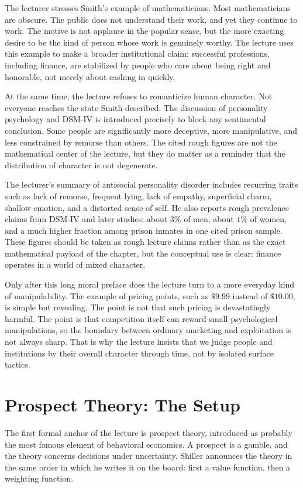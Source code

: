 The lecturer stresses Smith's example of mathematicians. Most mathematicians are obscure. The public does not understand their work, and yet they continue to work. The motive is not applause in the popular sense, but the more exacting desire to be the kind of person whose work is genuinely worthy. The lecture uses this example to make a broader institutional claim: successful professions, including finance, are stabilized by people who care about being right and honorable, not merely about cashing in quickly.

At the same time, the lecture refuses to romanticize human character. Not everyone reaches the state Smith described. The discussion of personality psychology and DSM-IV is introduced precisely to block any sentimental conclusion. Some people are significantly more deceptive, more manipulative, and less constrained by remorse than others. The cited rough figures are not the mathematical center of the lecture, but they do matter as a reminder that the distribution of character is not degenerate.

The lecturer's summary of antisocial personality disorder includes recurring traits such as lack of remorse, frequent lying, lack of empathy, superficial charm, shallow emotion, and a distorted sense of self. He also reports rough prevalence claims from DSM-IV and later studies: about \(3\%\) of men, about \(1\%\) of women, and a much higher fraction among prison inmates in one cited prison sample. These figures should be taken as rough lecture claims rather than as the exact mathematical payload of the chapter, but the conceptual use is clear: finance operates in a world of mixed character.

Only after this long moral preface does the lecture turn to a more everyday kind of manipulability. The example of pricing points, such as \(\$9.99\) instead of \(\$10.00\), is simple but revealing. The point is not that such pricing is devastatingly harmful. The point is that competition itself can reward small psychological manipulations, so the boundary between ordinary marketing and exploitation is not always sharp. That is why the lecture insists that we judge people and institutions by their overall character through time, not by isolated surface tactics.

\section{Prospect Theory: The Setup}

The first formal anchor of the lecture is prospect theory, introduced as probably the most famous element of behavioral economics. A prospect is a gamble, and the theory concerns decisions under uncertainty. Shiller announces the theory in the same order in which he writes it on the board: first a value function, then a weighting function.

